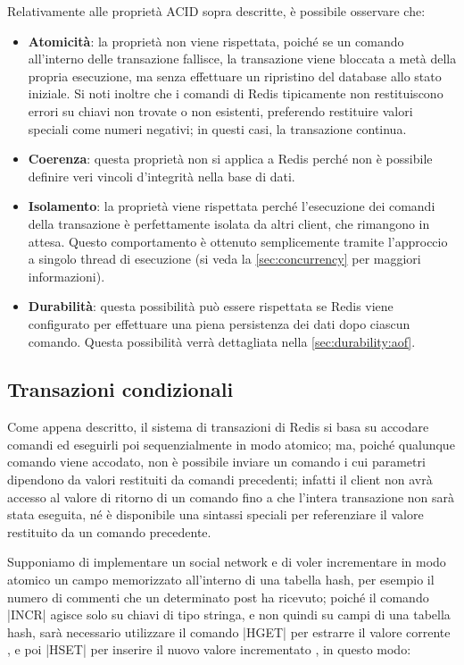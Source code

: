 Relativamente alle proprietà ACID sopra descritte, è possibile osservare che:

\begin{itemize}
	\item \textbf{Atomicità}: la proprietà non viene rispettata, poiché se un comando all'interno
	delle transazione fallisce, la transazione viene bloccata a metà della propria esecuzione,
	ma senza effettuare un ripristino del database allo stato iniziale. Si noti inoltre che i
	comandi di Redis tipicamente non restituiscono errori su chiavi non trovate o non esistenti, 
	preferendo restituire valori speciali come numeri negativi; in questi casi, la transazione
	continua. 

	\item \textbf{Coerenza}: questa proprietà non si applica a Redis perché non è possibile definire 
	veri vincoli d'integrità nella base di dati.

	\item \textbf{Isolamento}: la proprietà viene rispettata perché l'esecuzione dei comandi
	della transazione è perfettamente isolata da altri client, che rimangono in attesa. Questo
	comportamento è ottenuto semplicemente tramite l'approccio a singolo thread di esecuzione (si
	veda la \autoref{sec:concurrency} per maggiori informazioni).

	\item \textbf{Durabilità}: questa possibilità può essere rispettata se Redis viene configurato
	per effettuare una piena persistenza dei dati dopo ciascun comando. Questa possibilità
	verrà dettagliata nella	\autoref{sec:durability:aof}.
\end{itemize}


\subsection{Transazioni condizionali}

Come appena descritto, il sistema di transazioni di Redis si basa su accodare comandi ed eseguirli
poi sequenzialmente in modo atomico; ma, poiché qualunque comando viene accodato, non è possibile
inviare un comando i cui parametri dipendono da valori restituiti da comandi precedenti; infatti il
client non avrà accesso al valore di ritorno di un comando fino a che l'intera transazione non sarà
stata eseguita, né è disponibile una sintassi speciali per referenziare il valore restituito da un
comando precedente.

Supponiamo di implementare un social network e di voler incrementare in modo atomico un campo
memorizzato all'interno di una tabella hash, per esempio il numero di commenti che un determinato
post ha ricevuto; poiché il comando \cverb|INCR| agisce solo su chiavi di tipo stringa, e non quindi
su campi di una tabella hash, sarà necessario utilizzare il comando \cverb|HGET| per estrarre il
valore corrente , e poi \cverb|HSET| per inserire il nuovo valore incrementato , in
questo modo:

